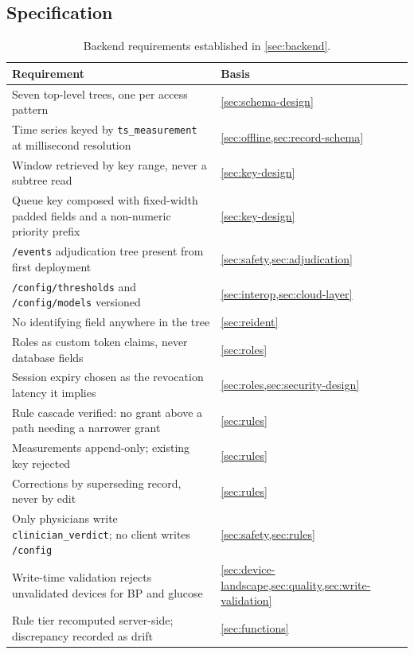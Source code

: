 \documentclass[12pt,a4paper,oneside]{report}
\begin{document}
\subsection{Specification}\label{sec:spec43}

\begin{table}[htbp]
\centering\footnotesize
\caption{Backend requirements established in \cref{sec:backend}.}\label{tab:spec43}
\begin{tabularx}{\textwidth}{@{}X >{\raggedright\arraybackslash}p{4.8cm}@{}}
\toprule
\textbf{Requirement} & \textbf{Basis} \\
\midrule
Seven top-level trees, one per access pattern & \cref{sec:schema-design} \\
Time series keyed by \texttt{ts\_measurement} at millisecond resolution & \cref{sec:offline,sec:record-schema} \\
Window retrieved by key range, never a subtree read & \cref{sec:key-design} \\
Queue key composed with fixed-width padded fields and a non-numeric priority prefix & \cref{sec:key-design} \\
\texttt{/events} adjudication tree present from first deployment & \cref{sec:safety,sec:adjudication} \\
\texttt{/config/thresholds} and \texttt{/config/models} versioned & \cref{sec:interop,sec:cloud-layer} \\
No identifying field anywhere in the tree & \cref{sec:reident} \\
Roles as custom token claims, never database fields & \cref{sec:roles} \\
Session expiry chosen as the revocation latency it implies & \cref{sec:roles,sec:security-design} \\
Rule cascade verified: no grant above a path needing a narrower grant & \cref{sec:rules} \\
Measurements append-only; existing key rejected & \cref{sec:rules} \\
Corrections by superseding record, never by edit & \cref{sec:rules} \\
Only physicians write \texttt{clinician\_verdict}; no client writes \texttt{/config} & \cref{sec:safety,sec:rules} \\
Write-time validation rejects unvalidated devices for BP and glucose & \cref{sec:device-landscape,sec:quality,sec:write-validation} \\
Rule tier recomputed server-side; discrepancy recorded as drift & \cref{sec:functions} \\

\end{tabularx}
\end{table}
\end{document}
